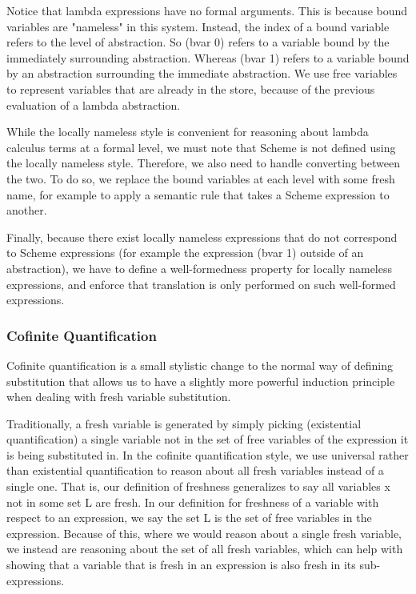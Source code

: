 Notice that lambda expressions have no formal arguments. This is because bound variables are "nameless" in this system. Instead, the index of a bound variable refers to the level of abstraction. So (bvar 0) refers to a variable bound by the immediately surrounding abstraction. Whereas (bvar 1) refers to a variable bound by an abstraction surrounding the immediate abstraction. We use free variables to represent variables that are already in the store, because of the previous evaluation of a lambda abstraction.

While the locally nameless style is convenient for reasoning about lambda calculus terms at a formal level, we must note that Scheme is not defined using the locally nameless style. Therefore, we also need to handle converting between the two. To do so, we replace the bound variables at each level with some fresh name, for example to apply a semantic rule that takes a Scheme expression to another.

Finally, because there exist locally nameless expressions that do not correspond to Scheme expressions (for example the expression (bvar 1) outside of an abstraction), we have to define a well-formedness property for locally nameless expressions, and enforce that translation is only performed on such well-formed expressions.

\subsubsection{Cofinite Quantification}
Cofinite quantification is a small stylistic change to the normal way of defining substitution that allows us to have a slightly more powerful induction principle when dealing with fresh variable substitution.

Traditionally, a fresh variable is generated by simply picking (existential quantification) a single variable not in the set of free variables of the expression it is being substituted in. In the cofinite quantification style, we use universal rather than existential quantification to reason about all fresh variables instead of a single one. That is, our definition of freshness generalizes to say all variables x not in some set L are fresh. In our definition for freshness of a variable with respect to an expression, we say the set L is the set of free variables in the expression. Because of this, where we would reason about a single fresh variable, we instead are reasoning about the set of all fresh variables, which can help with showing that a variable that is fresh in an expression is also fresh in its sub-expressions.

